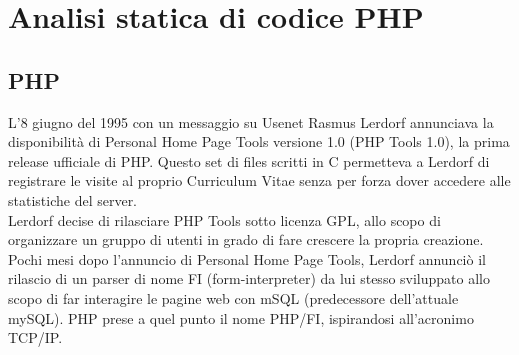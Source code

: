 \chapter{Analisi statica di codice PHP}

\section{PHP}
L’8 giugno del 1995 con un messaggio su Usenet Rasmus Lerdorf annunciava la disponibilità di Personal Home Page Tools versione 1.0 (PHP Tools 1.0), la prima release ufficiale di PHP. Questo set di files scritti in C permetteva a Lerdorf di registrare le visite al proprio Curriculum Vitae senza per forza dover accedere alle statistiche del server.\\
Lerdorf decise di rilasciare PHP Tools sotto licenza GPL, allo scopo di organizzare un gruppo di utenti in grado di fare crescere la propria creazione. Pochi mesi dopo l’annuncio di Personal Home Page Tools, Lerdorf annunciò il rilascio di un parser di nome FI (form-interpreter) da lui stesso sviluppato allo scopo di far interagire le pagine web con mSQL (predecessore dell’attuale mySQL). PHP prese a quel punto il nome PHP/FI, ispirandosi all'acronimo TCP/IP.

